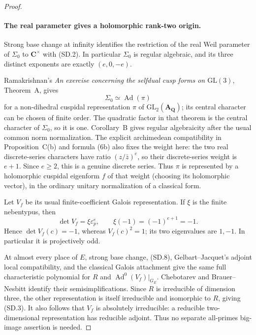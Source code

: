 \begin{proof}
\paragraph{The real parameter gives a holomorphic rank-two origin.}
Strong base change at infinity identifies the restriction of the
real Weil parameter of $\Sigma_0$ to $\mathbf C^\times$ with
(SD.2).  In particular $\Sigma_0$ is regular algebraic, and its
three distinct exponents are exactly $(e,0,-e)$.

Ramakrishnan's \emph{An exercise concerning the selfdual cusp forms
on $\mathrm{GL}(3)$}, Theorem~A, gives
\[
                            \Sigma_0\simeq\operatorname{Ad}(\pi)
                                                               \tag{SD.8}
\]
for a non-dihedral cuspidal representation $\pi$ of
$\mathrm{GL}_2(\mathbf A_{\mathbf Q})$; its central character
can be chosen of finite order.  The quadratic factor in that
theorem is the central character of $\Sigma_0$, so it is one.
Corollary~B gives regular algebraicity after the usual common
norm normalization.  The explicit archimedean compatibility
in Proposition~C(b) and formula (6b) also fixes the weight here:
the two real discrete-series characters have ratio
$(z/\bar z)^e$, so their discrete-series weight is $e+1$.
Since $e\ge2$, this is a genuine discrete series.  Thus $\pi$
is represented by a holomorphic cuspidal eigenform $f$ of that
weight (choosing its holomorphic vector), in the ordinary
unitary normalization of a classical form.

Let $V_f$ be its usual finite-coefficient Galois representation.
If $\xi$ is the finite nebentypus, then
\[
                 \det V_f=\xi\varepsilon_p^e,
                 \qquad \xi(-1)=(-1)^{e+1}=-1.           \tag{SD.9}
\]
Hence $\det V_f(c)=-1$, whereas $V_f(c)^2=1$; its two
eigenvalues are $1,-1$.  In particular it is projectively odd.

At almost every place of $E$, strong base change, (SD.8),
Gelbart--Jacquet's adjoint local compatibility, and the classical
Galois attachment give the same full characteristic polynomial
for $R$ and $\operatorname{Ad}^0(V_f)|_{G_E}$.  Chebotarev and
Brauer--Nesbitt identify their semisimplifications.  Since $R$
is irreducible of dimension three, the other representation
is itself irreducible and isomorphic to $R$, giving (SD.3).
It also follows that $V_f$ is absolutely irreducible: a
reducible two-dimensional representation has reducible adjoint.
Thus no separate all-primes big-image assertion is needed.
\end{proof}

